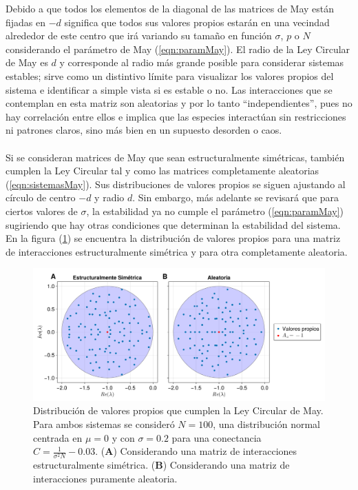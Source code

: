 Debido a que todos los elementos de la diagonal de las matrices de May están fijadas en $-d$ significa que todos sus valores propios estarán en una vecindad alrededor de este centro que irá variando su tamaño en función $\sigma$, $p$ o $N$ considerando el parámetro de May (\ref{eqn:paramMay}). El radio de la Ley Circular de May es $d$ y corresponde al radio más grande posible para considerar sistemas estables; sirve como un distintivo límite para visualizar los valores propios del sistema e identificar a simple vista si es estable o no. Las interacciones que se contemplan en esta matriz son aleatorias y por lo tanto ``independientes'', pues no hay correlación entre ellos e implica que las especies interactúan sin restricciones ni patrones claros, sino más bien en un supuesto desorden o caos.\\
\\
Si se consideran matrices de May que sean estructuralmente simétricas, también cumplen la Ley Circular tal y como las matrices completamente aleatorias (\ref{eqn:sistemasMay}). Sus distribuciones de valores propios se siguen ajustando al círculo de centro $-d$ y radio $d$. Sin embargo, más adelante se revisará que para ciertos valores de $\sigma$, la estabilidad ya no cumple el parámetro (\ref{eqn:paramMay}) sugiriendo que hay otras condiciones que determinan la estabilidad del sistema. En la figura (\ref{fig:LeyCircularMay}) se encuentra la distribución de valores propios para una matriz de interacciones estructuralmente simétrica y para otra completamente aleatoria. 
\begin{figure}[h!]
	\centering
	\includegraphics[scale=0.2]{../Imagenes/LeyCircularMay}
	\caption{Distribución de valores propios que cumplen la Ley Circular de May. Para ambos sistemas se consideró $N=100$, una distribución normal centrada en $\mu=0$ y con $\sigma=0.2$ para una conectancia $C=\frac{1}{\sigma^2 N}-0.03$. (\textbf{A}) Considerando una matriz de interacciones estructuralmente simétrica. (\textbf{B}) Considerando una matriz de interacciones puramente aleatoria.}
	\label{fig:LeyCircularMay}
\end{figure}

